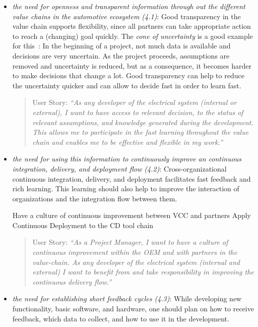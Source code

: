 \begin{itemize}
\begin{itemize}
\item {\em the need for openness and transparent information through out the different value chains in the automotive ecosystem (4.1)}: Good transparency in the value chain supports flexibility, since all partners can take appropriate action to reach a (changing) goal quickly. 
The \emph{cone of uncertainty} is a good example for this~\cite{cone-of-uncertainty,cone-of-uncertainty2}: In the beginning of a project, not much data is available and decisions are very uncertain. 
As the project proceeds, assumptions are removed and uncertainty is reduced, but as  a consequence, it becomes harder to make decisions that change a lot. 
Good transparency can help to reduce the uncertainty quicker and can allow to decide fast in order to learn fast.
\begin{quote}
{User Story:} 
\emph{``As any developer of the electrical system (internal or external), I want to have access to relevant decision, to the status of relevant assumptions, and knowledge generated during the development. 
This allows me to participate in the fast learning throughout the value chain and enables me to be effective and flexible in my work.''}
\end{quote}

\item {\em the need for using this information to continuously improve an continuous integration, delivery, and deployment flow (4.2)}: 
Cross-organizational continuous integration, delivery, and deployment facilitates fast feedback and rich learning.
This learning should also help to improve the interaction of organizations and the integration flow between them.

Have a culture of continuous improvement between VCC and partners	Apply Continuous Deployment to the CD tool chain

\begin{quote}
{User Story:} 
\emph{``As a Project Manager, I want to have a culture of continuous improvement within the OEM and with partners in the value-chain. As any developer of the electrical system (internal and external) I want to benefit from and take responsibility in improving the continuous delivery flow.''}
\end{quote}

\item {\em the need for establishing short feedback cycles (4.3)}: While developing new functionality, basic software, and hardware, one should plan on how to receive feedback, which data to collect, and how to use it in the development.


\end{itemize}
\end{itemize}
